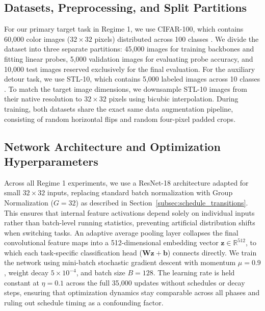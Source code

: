 \documentclass[10pt]{article}
\begin{document}
\subsection{Datasets, Preprocessing, and Split Partitions}\label{subsec:protocol_datasets}
For our primary target task in Regime 1, we use CIFAR-100, which contains 60,000 color images ($32 \times 32$ pixels) distributed across 100 classes \cite{krizhevsky2009cifar}. We divide the dataset into three separate partitions: 45,000 images for training backbones and fitting linear probes, 5,000 validation images for evaluating probe accuracy, and 10,000 test images reserved exclusively for the final evaluation. For the auxiliary detour task, we use STL-10, which contains 5,000 labeled images across 10 classes \cite{coates2011stl10}. To match the target image dimensions, we downsample STL-10 images from their native resolution to $32 \times 32$ pixels using bicubic interpolation. During training, both datasets share the exact same data augmentation pipeline, consisting of random horizontal flips and random four-pixel padded crops.

\subsection{Network Architecture and Optimization Hyperparameters}\label{subsec:protocol_model}
Across all Regime 1 experiments, we use a ResNet-18 architecture \cite{he2016deep} adapted for small $32 \times 32$ inputs, replacing standard batch normalization with Group Normalization ($G = 32$) \cite{wu2018groupnorm} as described in Section~\ref{subsec:schedule_transitions}. This ensures that internal feature activations depend solely on individual inputs rather than batch-level running statistics, preventing artificial distribution shifts when switching tasks. An adaptive average pooling layer collapses the final convolutional feature maps into a 512-dimensional embedding vector $\bm{z} \in \mathbb{R}^{512}$, to which each task-specific classification head ($\bm{W}\bm{z} + \bm{b}$) connects directly. We train the network using mini-batch stochastic gradient descent with momentum $\mu = 0.9$, weight decay $5 \times 10^{-4}$, and batch size $B = 128$. The learning rate is held constant at $\eta = 0.1$ across the full 35,000 updates without schedules or decay steps, ensuring that optimization dynamics stay comparable across all phases and ruling out schedule timing as a confounding factor.
\end{document}
